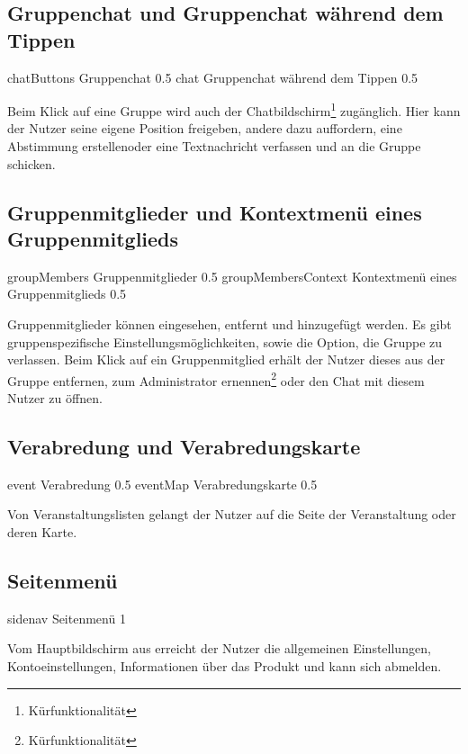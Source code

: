 \documentclass[parskip=full,11pt]{scrartcl}
\begin{document}
\pagebreak
\subsection{Gruppenchat und Gruppenchat während dem Tippen}
{chatButtons}
{Gruppenchat}
{0.5}
{chat}
{Gruppenchat während dem Tippen}
{0.5}

Beim Klick auf eine Gruppe wird auch der
Chatbildschirm\footnote[1]{Kürfunktionalität} zugänglich.
Hier kann der Nutzer seine eigene Position freigeben, andere dazu auffordern,
eine Abstimmung erstellen\footnotemark[1] oder eine Textnachricht verfassen
und an die Gruppe schicken\footnotemark[1].

\pagebreak
\subsection{Gruppenmitglieder und Kontextmenü eines Gruppenmitglieds}
{groupMembers}
{Gruppenmitglieder}
{0.5}
{groupMembersContext}
{Kontextmenü eines Gruppenmitglieds}
{0.5}

Gruppenmitglieder können eingesehen, entfernt und hinzugefügt werden.
Es gibt gruppenspezifische Einstellungsmöglichkeiten, sowie die Option,
die Gruppe zu verlassen.
Beim Klick auf ein Gruppenmitglied erhält der Nutzer dieses aus der
Gruppe entfernen, zum Administrator ernennen\footnote[1]{Kürfunktionalität}
oder den Chat mit diesem Nutzer zu öffnen\footnotemark[1].

\pagebreak
\subsection{Verabredung  und Verabredungskarte}
{event}
{Verabredung}
{0.5}
{eventMap}
{Verabredungskarte}
{0.5}

Von Veranstaltungslisten gelangt der Nutzer auf die Seite der Veranstaltung oder deren Karte.

\pagebreak
\subsection{Seitenmenü}
{sidenav}
{Seitenmenü}
{1}

Vom Hauptbildschirm aus erreicht der Nutzer die allgemeinen Einstellungen, Kontoeinstellungen, Informationen über das Produkt und kann sich abmelden.
\end{document}
